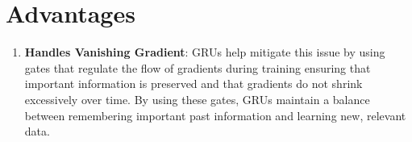 \section{Advantages}

\begin{enumerate}
    \item \textbf{Handles Vanishing Gradient}: GRUs help mitigate this issue by using gates that regulate the flow of gradients during training ensuring that important information is preserved and that gradients do not shrink excessively over time. 
    By using these gates, GRUs maintain a balance between remembering important past information and learning new, relevant data.
    \hfill \cite{geeksforgeeks/machine-learning/gated-recurrent-unit-networks}
\end{enumerate}












